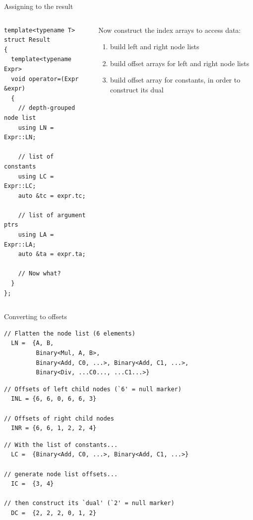 \documentclass[xcolor=dvipsnames]{beamer}
\begin{document}
\begin{frame}[fragile]{Assigning to the result}
  \begin{columns}[T] %
    \begin{column}{0.56\textwidth}
\begin{lstlisting}
template<typename T>
struct Result
{
  template<typename Expr>
  void operator=(Expr &expr)
  {
    // depth-grouped node list
    using LN = Expr::LN;

    // list of constants
    using LC = Expr::LC;
    auto &tc = expr.tc;

    // list of argument ptrs
    using LA = Expr::LA;
    auto &ta = expr.ta;

    // Now what?
  }
};
\end{lstlisting}
    \end{column}%
    \hfill%
    \begin{column}{0.44\textwidth}
      \vspace{5mm}
      Now construct the index arrays to access data: \vspace{5mm}
      \begin{enumerate}
      \item build left and right node lists \vspace{5mm}
      \item build offset arrays for left and right node lists \vspace{5mm}
      \item build offset array for constants, in order to construct its {\color{blue}dual} \vspace{5mm}
      \end{enumerate}
    \end{column}%
  \end{columns}
\end{frame}


\begin{frame}[fragile]{Converting to offsets}
\begin{lstlisting}
// Flatten the node list (6 elements)
  LN =  {A, B,
         Binary<Mul, A, B>,
         Binary<Add, C0, ...>, Binary<Add, C1, ...>,
         Binary<Div, ...C0..., ...C1...>}
\end{lstlisting}
\begin{lstlisting}
// Offsets of left child nodes (`6' = null marker)
  INL = {6, 6, 0, 6, 6, 3}

// Offsets of right child nodes
  INR = {6, 6, 1, 2, 2, 4}
\end{lstlisting}
\begin{lstlisting}
// With the list of constants...
  LC =  {Binary<Add, C0, ...>, Binary<Add, C1, ...>}

// generate node list offsets...
  IC =  {3, 4}

// then construct its `dual' (`2' = null marker)
  DC =  {2, 2, 2, 0, 1, 2}
\end{lstlisting}
\begin{lstlisting}
\end{lstlisting}
\end{frame}
\end{document}
